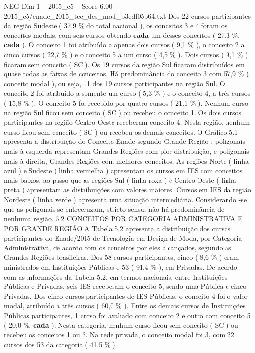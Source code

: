 \begin{textsample}{NEG Dim 1 – 2015\_c5 – Score 6.00 – 2015\_c5/enade\_2015\_tec\_des\_mod\_b3edf05b64.txt}
Dos 22 cursos participantes da região Sudeste ( 37,9 \% do total nacional ), os conceitos 3 e 4 foram os conceitos modais, com seis cursos obtendo \textbf{cada} um desses conceitos ( 27,3 \%, \textbf{cada} ).
O conceito 1 foi atribuído a apenas dois cursos ( 9,1 \% ), o conceito 2 a cinco cursos ( 22,7 \% ) e o conceito 5 a um curso ( 4,5 \% ).
Dois cursos ( 9,1 \% ) ficaram sem conceito ( SC ).
Os 19 cursos da região Sul ficaram distribuídos em quase todas as faixas de conceitos.
Há predominância do conceito 3 com 57,9 \% ( conceito modal ), ou seja, 11 dos 19 cursos participantes na região Sul.
O conceito 2 foi atribuído a somente um curso ( 5,3 \% ) e o conceito 4, a três cursos ( 15,8 \% ).
O conceito 5 foi recebido por quatro cursos ( 21,1 \% ).
Nenhum curso na região Sul ficou sem conceito ( SC ) ou recebeu o conceito 1.
Os dois cursos participantes na região Centro-Oeste receberam conceito 4.
Nesta região, nenhum curso ficou sem conceito ( SC ) ou recebeu os demais conceitos.
O Gráfico 5.1 apresenta a distribuição do Conceito Enade segundo Grande Região : poligonais mais à esquerda representam Grandes Regiões com pior distribuição, e poligonais mais à direita, Grandes Regiões com melhores conceitos.
As regiões Norte ( linha azul ) e Sudeste ( linha vermelha ) apresentam os cursos em IES com conceitos mais baixos, ao passo que as regiões Sul ( linha roxa ) e Centro-Oeste ( linha preta ) apresentam as distribuições com valores maiores.
Cursos em IES da região Nordeste ( linha verde ) apresenta uma situação intermediária.
Considerando -se que as poligonais se entrecruzam, stricto sensu, não há predominância de nenhuma região. 5.2 CONCEITOS POR CATEGORIA ADMINISTRATIVA E POR GRANDE REGIÃO A Tabela 5.2 apresenta a distribuição dos cursos participantes do Enade/2015 de Tecnologia em Design de Moda, por Categoria Administrativa, de acordo com os conceitos por eles alcançados, segundo as Grandes Regiões brasileiras.
Dos 58 cursos participantes, cinco ( 8,6 \% ) eram ministrados em Instituições Públicas e 53 ( 91,4 \% ), em Privadas.
De acordo com as informações da Tabela 5.2, em termos nacionais, entre Instituições Públicas e Privadas, seis IES receberam o conceito 5, sendo uma Pública e cinco Privadas.
Dos cinco cursos participantes de IES Públicas, o conceito 4 foi o valor modal, atribuído a três cursos ( 60,0 \% ).
Entre os demais cursos de Instituições Públicas participantes, 1 curso foi avaliado com conceito 2 e outro com conceito 5 ( 20,0 \%, \textbf{cada} ).
Nesta categoria, nenhum curso ficou sem conceito ( SC ) ou recebeu os conceitos 1 ou 3.
Na rede privada, o conceito modal foi 3, com 22 cursos dos 53 da categoria ( 41,5 \% ).

\end{textsample}
